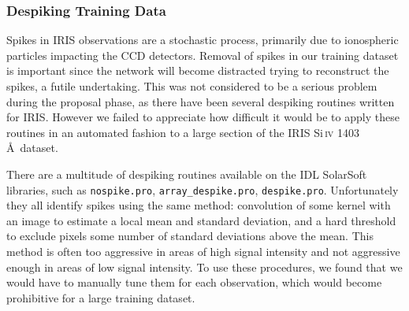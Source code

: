 \documentclass[10pt,letterpaper]{article}
\newcommand{\SiIV}{Si\,\textsc{iv} 1403 \AA}
\begin{document}
				
							
			\subsubsection{Despiking Training Data}	\label{sec_dspk}
			
				Spikes in IRIS observations are a stochastic process, primarily due to ionospheric particles impacting the CCD detectors.
				Removal of spikes in our training dataset is important since the network will become distracted trying to reconstruct the spikes, a futile undertaking.
				This was not considered to be a serious problem during the proposal phase, as there have been several despiking routines written for IRIS.
				However we failed to appreciate how difficult it would be to apply these routines in an automated fashion to a large section of the IRIS \SiIV\ dataset.
				
				There are a multitude of despiking routines available on the IDL SolarSoft libraries, such as \texttt{nospike.pro}, \texttt{array\_despike.pro}, \texttt{despike.pro}.
				Unfortunately they all identify spikes using the same method: convolution of some kernel with an image to estimate a local mean and standard deviation, and a hard threshold to exclude pixels some number of standard deviations above the mean.
				This method is often too aggressive in areas of high signal intensity and not aggressive enough in areas of low signal intensity.
				To use these procedures, we found that we would have to manually tune them for each observation, which would become prohibitive for a large training dataset.
				
				 
			
\end{document}
